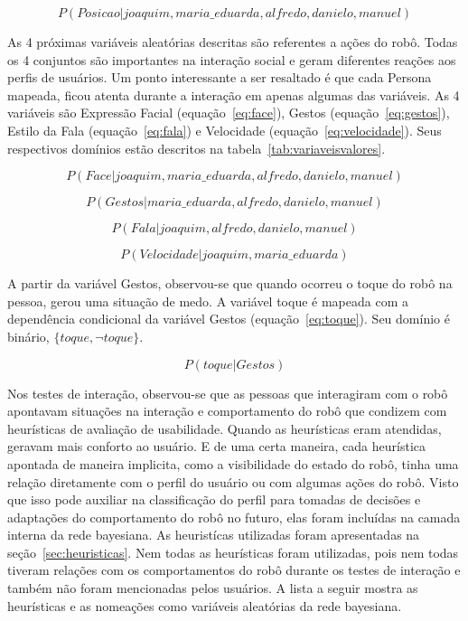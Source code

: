 \begin{equation}
	\label{eq:posicao}
	P(Posicao | joaquim, maria\_eduarda, alfredo, danielo, manuel)
\end{equation}

As 4 próximas variáveis aleatórias descritas são referentes a ações do robô. Todas os 4 conjuntos são importantes na interação social e geram diferentes reações aos perfis de usuários. Um ponto interessante a ser resaltado é que cada Persona mapeada, ficou atenta durante a interação em apenas algumas das variáveis. As 4 variáveis são Expressão Facial (equação~\ref{eq:face}), Gestos (equação~\ref{eq:gestos}), Estilo da Fala (equação~\ref{eq:fala}) e Velocidade (equação~\ref{eq:velocidade}). Seus respectivos domínios estão descritos na tabela~\ref{tab:variaveisvalores}.

\begin{equation}
	\label{eq:face}
	P(Face | joaquim, maria\_eduarda, alfredo, danielo, manuel)
\end{equation}

\begin{equation}
	\label{eq:gestos}
	P(Gestos | maria\_eduarda, alfredo, danielo, manuel)
\end{equation}

\begin{equation}
	\label{eq:fala}
	P(Fala | joaquim, alfredo, danielo, manuel)
\end{equation}

\begin{equation}
	\label{eq:velocidade}
	P(Velocidade | joaquim, maria\_eduarda)
\end{equation}

A partir da variável Gestos, observou-se que quando ocorreu o toque do robô na pessoa, gerou uma situação de medo. A variável toque é mapeada com a dependência condicional da variável Gestos (equação~\ref{eq:toque}). Seu domínio é binário, $\{toque, \neg toque\}$.

\begin{equation}
	\label{eq:toque}
	P(toque | Gestos)
\end{equation}

Nos testes de interação, observou-se que as pessoas que interagiram com o robô apontavam situações na interação e comportamento do robô que condizem com heurísticas de avaliação de usabilidade. Quando as heurísticas eram atendidas, geravam mais conforto ao usuário. E de uma certa maneira, cada heurística apontada de maneira implicita, como a visibilidade do estado do robô, tinha uma relação diretamente com o perfil do usuário ou com algumas ações do robô. Visto que isso pode auxiliar na classificação do perfil para tomadas de decisões e adaptações do comportamento do robô no futuro, elas foram incluídas na camada interna da rede bayesiana. As heuristícas utilizadas foram apresentadas na seção~\ref{sec:heuristicas}. Nem todas as heurísticas foram utilizadas, pois nem todas tiveram relações com os comportamentos do robô durante os testes de interação e também não foram mencionadas pelos usuários. A lista a seguir mostra as heurísticas e as nomeações como variáveis aleatórias da rede bayesiana.


